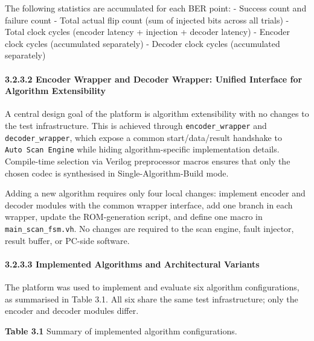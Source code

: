 The following statistics are accumulated for each BER point: - Success
count and failure count - Total actual flip count (sum of injected bits
across all trials) - Total clock cycles (encoder latency + injection +
decoder latency) - Encoder clock cycles (accumulated separately) -
Decoder clock cycles (accumulated separately)

\paragraph{3.2.3.2 Encoder Wrapper and Decoder Wrapper: Unified
Interface for Algorithm
Extensibility}\label{encoder-wrapper-and-decoder-wrapper-unified-interface-for-algorithm-extensibility}

A central design goal of the platform is algorithm extensibility with no
changes to the test infrastructure. This is achieved through
\texttt{encoder\_wrapper} and \texttt{decoder\_wrapper}, which expose a
common start/data/result handshake to \texttt{Auto\ Scan\ Engine} while
hiding algorithm-specific implementation details. Compile-time selection
via Verilog preprocessor macros ensures that only the chosen codec is
synthesised in Single-Algorithm-Build mode.

Adding a new algorithm requires only four local changes: implement
encoder and decoder modules with the common wrapper interface, add one
branch in each wrapper, update the ROM-generation script, and define one
macro in \texttt{main\_scan\_fsm.vh}. No changes are required to the
scan engine, fault injector, result buffer, or PC-side software.

\paragraph{3.2.3.3 Implemented Algorithms and Architectural
Variants}\label{implemented-algorithms-and-architectural-variants}

The platform was used to implement and evaluate six algorithm
configurations, as summarised in Table 3.1. All six share the same test
infrastructure; only the encoder and decoder modules differ.

\textbf{Table 3.1} Summary of implemented algorithm configurations.

